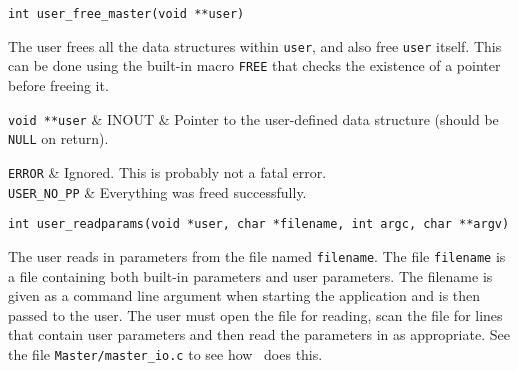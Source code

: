 \ed

\vspace{1ex}


\begin{verbatim}
int user_free_master(void **user)
\end{verbatim}

\bd

\describe

The user frees all the data structures within {\tt *user}, and
also free {\tt *user} itself. This can be done using the built-in macro
{\tt FREE} that checks the existence of a pointer before freeing it.

\args

{\tt void **user} & INOUT & Pointer to the user-defined data structure
(should be {\tt NULL} on return). \\
\et

\returns

{\tt ERROR} & Ignored. This is probably not a fatal error.\\
{\tt USER\_NO\_PP} & Everything was freed successfully. \\
\et

\ed

\vspace{1ex}


\begin{verbatim}
int user_readparams(void *user, char *filename, int argc, char **argv)
\end{verbatim}

\bd

\describe

The user reads in parameters from the file named {\tt filename}. The
file {\tt filename} is a file containing both built-in parameters and
user parameters. The filename is given as a command line argument when
starting the application and is then passed to the user. The user must
open the file for reading, scan the file for lines that contain user
parameters and then read the parameters in as appropriate. See the
file {\tt Master/master\_io.c} to see how \BB\ does this.

